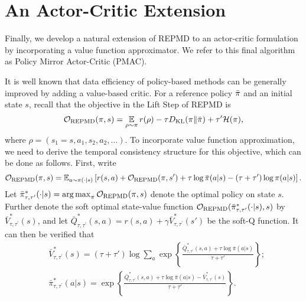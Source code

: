 


\section{An Actor-Critic Extension}
\label{subsec:repmd_value}

\newcommand{\parV}{V_{\phi}}
\newcommand{\parTargetV}{V_{\bar{\phi}}}
\newcommand{\parQ}{Q_{\psi}}
\newcommand{\parPi}{\pi_{\theta}}
\newcommand{\parQone}{Q_{\psi_1}}
\newcommand{\parQtwo}{Q_{\psi_2}}


Finally, we develop a natural extension of REPMD to an actor-critic
formulation by incorporating a value function approximator.
We refer to this final algorithm as Policy Mirror Actor-Critic (PMAC). 

It is well known that data efficiency of policy-based methods 
can be generally improved by adding a value-based critic.
For a reference policy $\bar{\pi}$ and an initial state $s$,
recall that the objective in the Lift Step of REPMD is 
\[
{\mathcal{O}}_{\text{REPMD}}(\pi, s) =   \operatorname*{\mathbb{E}}\limits_{\rho \sim \pi}{  r(\rho)  - \tau D_{\mathrm{KL}}(\pi \| \bar{\pi}) + \tau^{\prime} \mathcal{H}(\pi)}, 
\]
where $\rho=  (s_1 = s, a_1, s_2, a_2, \ldots)$.
To incorporate value function approximation, we need to derive 
the temporal consistency structure for this objective, 
which can be done as follows. 
First, write
 \[
 {\mathcal{O}}_{\text{REPMD}}(\pi, s) = \mathbb{E}_{a\sim \pi(\cdot \vert s)} \left[ r(s,a) + {\mathcal{O}}_{\text{REPMD}}(\pi, s')  + \tau \log \bar{\pi}(a|s) - \left(\tau+ \tau' \right) \log \pi(a|s) \right]. 
 \]
Let $\bar{\pi}_{\tau,\tau^{\prime}}^* (\cdot|s) = \operatorname*{arg\,max}_{\pi} {\mathcal{O}}_{\text{REPMD}}(\pi, s) $ denote the optimal policy on state $s$. 
%
Further denote the soft optimal state-value function ${\mathcal{O}}_{\text{REPMD}}(\bar{\pi}_{\tau,\tau^{\prime}}^* (\cdot|s), s)$ by $\bar{V}_{\tau,\tau^{\prime}}^*(s)$, and let  $\bar{Q}_{\tau,\tau^{\prime}}^*(s,a) = r(s,a) + \gamma \bar{V}_{\tau,\tau^{\prime}}^*(s')$ be the soft-Q function.
It can then be verified that 
%
\begin{equation}
\begin{split}
& \bar{V}_{\tau,\tau^{\prime}}^*(s) = (\tau + \tau') \log \sum_a \exp \left\{ \frac{\bar{Q}_{\tau,\tau^{\prime}}^*(s,a) + \tau \log \bar{\pi}(a|s)} {\tau + \tau'} \right\}; \\
& \bar{\pi}_{\tau,\tau^{\prime}}^* (a|s) = \exp \left\{ \frac{\bar{Q}_{\tau,\tau^{\prime}}^*(s,a) + \tau \log \bar{\pi}(a|s) - \bar{V}_{\tau,\tau^{\prime}}^*(s)}{\tau + \tau'} \right\}.
\end{split}
\label{soft-v-and-pi}
\end{equation}
 
